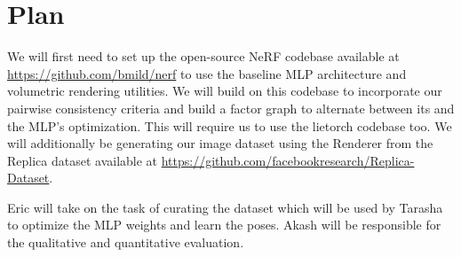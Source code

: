 \documentclass[15pt,letterpaper]{article}
\begin{document}
\section{Plan}%
\label{sec:Plan}

We will first need to set up the open-source NeRF codebase available at \hyperlink{https://github.com/bmild/nerf}{https://github.com/bmild/nerf} to use the baseline MLP architecture and volumetric rendering utilities. We will build on this codebase to incorporate our pairwise consistency criteria and build a factor graph to alternate between its and the MLP's optimization. This will require us to use the lietorch codebase too. We will additionally be generating our image dataset using the Renderer from the Replica dataset available at \hyperlink{https://github.com/facebookresearch/Replica-Dataset}{https://github.com/facebookresearch/Replica-Dataset}.

Eric will take on the task of curating the dataset which will be used by Tarasha to optimize the MLP weights and learn the poses. Akash will be responsible for the qualitative and quantitative evaluation.



\end{document}
